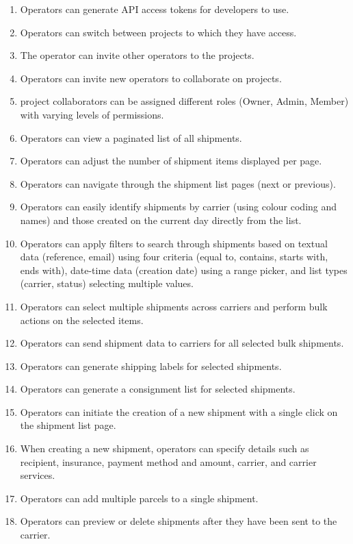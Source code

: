 \begin{enumerate}[label=\bfseries FR\arabic*:,leftmargin=*]
    \item Operators can generate API access tokens for developers to use.
    \item Operators can switch between \glspl{project} to which they have access.
    \item The operator can invite other operators to the \glspl{project}.
    \item Operators can invite new operators to collaborate on \glspl{project}.
    \item \Gls{project} collaborators can be assigned different roles (Owner, Admin, Member) with varying levels of permissions.
    \item Operators can view a paginated list of all shipments.
    \item Operators can adjust the number of shipment items displayed per page.
    \item Operators can navigate through the shipment list pages (next or previous).
    \item Operators can easily identify shipments by carrier (using colour coding and names) and those created on the current day directly from the list.
    \item Operators can apply filters to search through shipments based on textual data (reference, email) using four criteria (equal to, contains, starts with, ends with), date-time data (creation date) using a range picker, and list types (carrier, status) selecting multiple values.
    \item Operators can select multiple shipments across carriers and perform bulk actions on the selected items.
    \item Operators can send shipment data to carriers for all selected bulk shipments.
    \item Operators can generate shipping labels for selected shipments.
    \item Operators can generate a consignment list for selected shipments.
    \item Operators can initiate the creation of a new shipment with a single click on the shipment list page.
    \item When creating a new shipment, operators can specify details such as recipient, insurance, payment method and amount, carrier, and carrier services.
    \item Operators can add multiple parcels to a single shipment.
    \item Operators can preview or delete shipments after they have been sent to the carrier.

\end{enumerate}
